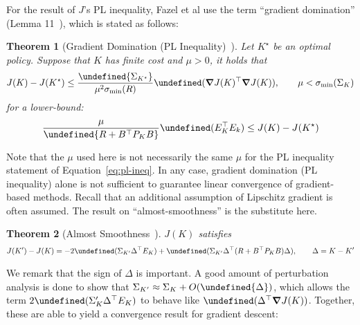 \documentclass[11pt]{article}  %
\newtheorem{theorem}{Theorem}
\let\norm\undefined
\newcommand{\norm}[1]{\lVert #1 \rVert}
\let\Tr\undefined
\DeclareMathOperator{\Tr}{Tr}
\begin{document}
For the result of \(J\)'s PL inequality, Fazel et al
use the term ``gradient domination'' (Lemma 11~\cite{fazel2018global}),
which is stated as follows:

\begin{theorem}[Gradient Domination (PL Inequality)~\cite{fazel2018global}]
  Let \(K^\star\) be an optimal policy.
  Suppose that \(K\) has finite cost and \(\mu > 0\), it holds that
  \begin{align}
  J(K) - J(K^\star)
    \leq \frac{\norm{\Sigma_{K^\star}}}{\mu^2 \sigma_{\min} (R)}
        \Tr (\grad J(K) ^\top \grad J(K)),
    \qquad \mu < \sigma_{\min} (\Sigma_K)
  \end{align}
  for a lower-bound:
  \begin{align}
    \frac{\mu}{\norm{R + B^\top P_K B}} \Tr (E_K ^\top E_k)
      \leq J(K) - J(K^\star)
  \end{align}
\end{theorem}

Note that the \(\mu\) used here is not necessarily the same \(\mu\)
for the PL inequality statement of Equation~\ref{eq:pl-ineq}.
In any case,
gradient domination (PL inequality) alone is not sufficient to guarantee
linear convergence of gradient-based methods.
Recall that an additional assumption of Lipschitz gradient is often assumed.
The result on ``almost-smoothness'' is the substitute here.

\begin{theorem}[Almost Smoothness~\cite{fazel2018global}]
  \(J(K)\) satisfies
  \begin{align}
    J(K^\prime) - J(K)
      = -2 \Tr (\Sigma_{K^\prime} \Delta^\top E_K)
        + \Tr(\Sigma_{K^\prime} \Delta^\top (R + B^\top P_K B) \Delta),
      \qquad
      \Delta = K - K^\prime
  \end{align}
\end{theorem}

We remark that the sign of \(\Delta\) is important.
A good amount of perturbation analysis is done to show that
\(\Sigma_{K^\prime} \approx \Sigma_K + O(\norm{\Delta})\),
which allows the term \(2 \Tr (\Sigma_K^\prime \Delta ^\top E_K)\)
to behave like \(\Tr (\Delta ^\top \grad J(K))\).
Together, these are able to yield a convergence result for gradient descent:
\end{document}
